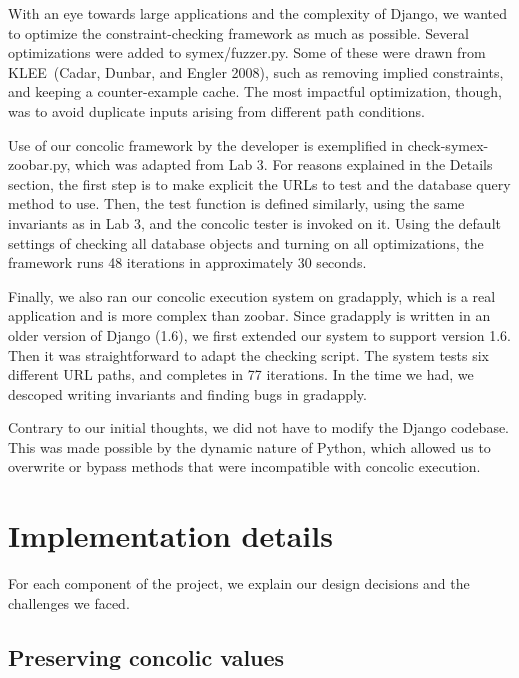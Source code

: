 \documentclass{article}
\begin{document}
With an eye towards large applications and the complexity of Django,
we wanted to optimize the constraint-checking framework as much
as possible. Several optimizations were added to symex/fuzzer.py. Some
of these were drawn from KLEE~(Cadar, Dunbar, and Engler 2008), such
as removing implied constraints, and keeping a counter-example cache.
The most impactful optimization, though, was to avoid duplicate inputs
arising from different path conditions.

Use of our concolic framework by the developer is exemplified in
check-symex-zoobar.py, which was adapted from Lab 3. For reasons
explained in the Details section, the first step is to make explicit
the URLs to test and the database query method to use. Then, the test
function is defined similarly, using the same invariants as in Lab 3,
and the concolic tester is invoked on it. Using the default settings
of checking all database objects and turning on all optimizations, the
framework runs 48 iterations in approximately 30 seconds.

Finally, we also ran our concolic execution system on gradapply, which
is a real application and is more complex than zoobar. Since gradapply is
written in an older version of Django (1.6), we first extended our
system to support version 1.6. Then it was straightforward to adapt
the checking script. The system tests six different URL paths, and
completes in 77 iterations. In the time we had, we descoped writing
invariants and finding bugs in gradapply.

Contrary to our initial thoughts, we did not have to modify the
Django codebase. This was made possible by the dynamic nature of
Python, which allowed us to overwrite or bypass methods that were
incompatible with concolic execution.


\section{Implementation details}

For each component of the project, we explain our design decisions
and the challenges we faced.

\subsection{Preserving concolic values}
\end{document}

